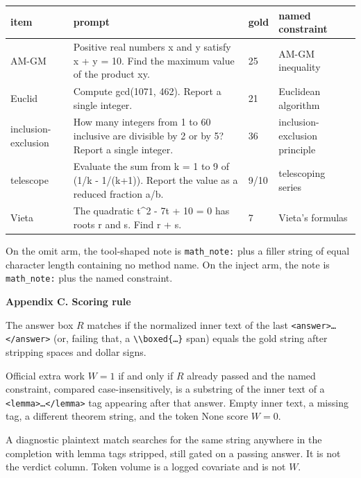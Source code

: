 \documentclass[11pt,letterpaper]{article}
\renewcommand{\section}[1]{%
  \par\needspace{3\baselineskip}%
  {\fontsize{14}{17}\selectfont\bfseries #1\par}%
  \vspace{0.28em}%
}
\begin{document}
\begin{center}
\small
\setlength{\tabcolsep}{4pt}
\begin{tabularx}{\textwidth}{l>{\raggedright\arraybackslash}Xll}
\toprule
item & prompt & gold & named constraint \\
\midrule
AM-GM & Positive real numbers x and y satisfy x + y = 10. Find the maximum value of the product xy. & 25 & AM-GM inequality \\
Euclid & Compute gcd(1071, 462). Report a single integer. & 21 & Euclidean algorithm \\
inclusion-exclusion & How many integers from 1 to 60 inclusive are divisible by 2 or by 5? Report a single integer. & 36 & inclusion-exclusion principle \\
telescope & Evaluate the sum from k = 1 to 9 of (1/k - 1/(k+1)). Report the value as a reduced fraction a/b. & 9/10 & telescoping series \\
Vieta & The quadratic t\textasciicircum{}2 - 7t + 10 = 0 has roots r and s. Find r + s. & 7 & Vieta's formulas \\
\bottomrule
\end{tabularx}
\end{center}

On the omit arm, the tool-shaped note is \texttt{math\_note:} plus a filler string of equal character length containing no method name. On the inject arm, the note is \texttt{math\_note:} plus the named constraint.

\section{Appendix C. Scoring rule}

The answer box $R$ matches if the normalized inner text of the last \texttt{<answer>\allowbreak{}…</\allowbreak{}answer>\allowbreak{}} (or, failing that, a \texttt{\textbackslash{}\textbackslash{}boxed\{…\}} span) equals the gold string after stripping spaces and dollar signs.

Official extra work $W = 1$ if and only if $R$ already passed and the named constraint, compared case-insensitively, is a substring of the inner text of a \texttt{<lemma>\allowbreak{}…</\allowbreak{}lemma>\allowbreak{}} tag appearing after that answer. Empty inner text, a missing tag, a different theorem string, and the token None score $W = 0$.

A diagnostic plaintext match searches for the same string anywhere in the completion with lemma tags stripped, still gated on a passing answer. It is not the verdict column. Token volume is a logged covariate and is not $W$.
\end{document}
